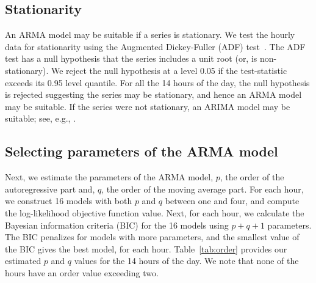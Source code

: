 \documentclass[review]{elsarticle}
\begin{document}
\subsection{Stationarity}
An ARMA model may be suitable if a series is stationary. We test 
the hourly data for stationarity using the Augmented 
Dickey-Fuller (ADF) test~\cite{dickey1979distribution}. The ADF test has a null 
hypothesis that the series includes a unit root (or, is non-stationary). We 
reject the null hypothesis at a level 0.05 if the test-statistic exceeds its 
0.95 level quantile. For all the 14 hours of the day, the null hypothesis is 
rejected suggesting the series may be stationary, and hence an ARMA model may 
be suitable. If the series were not stationary, an ARIMA model may be suitable; see, e.g., \cite{contreras2003arima}.

\subsection{Selecting parameters of the ARMA model}
Next, we estimate the parameters of the ARMA model, $p$, the order of the 
autoregressive part and, $q$, the order of the moving average part. For each 
hour, we construct 16 models with both $p$ and $q$ between one and four, and 
compute 
the log-likelihood objective function value. Next, for each hour, we calculate 
the Bayesian information criteria (BIC) for the 16 models using $p + q + 1$ 
parameters.  The BIC penalizes for models with more parameters, and the 
smallest value of the BIC gives the best model, for each 
hour. Table~\ref{tab:order} provides our estimated $p$ and $q$  values for 
the 14 hours of the day. We note that none of the hours have an order value 
exceeding two.

\begin{table}[!htb]
\centering
\caption{Estimated $p$ and $q$ values for ARMA($p,q$) models for 14 hours of 
the day}
\label{tab:order}
\end{table}
\end{document}
